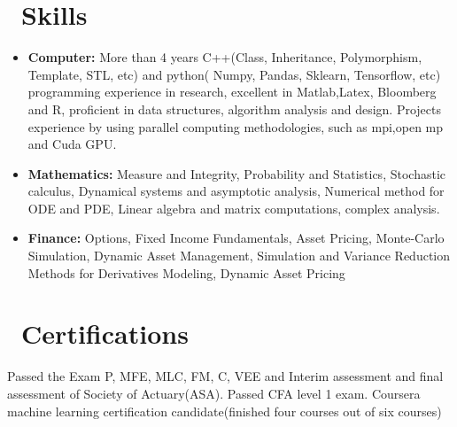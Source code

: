 \documentclass{resume}
\begin{document}
\section{\faWrench
\ Skills}
\begin{itemize}[parsep=0.5ex]\large
  \item \textbf{Computer:} More than 4 years C++(Class, Inheritance, Polymorphism, Template, STL, etc) and python( Numpy, Pandas,
  Sklearn, Tensorflow, etc) programming experience in research,  excellent in Matlab,Latex, Bloomberg and R, proficient in data structures, algorithm analysis and design. Projects experience by using parallel computing methodologies, such as mpi,open mp and Cuda GPU.
  
  \item \textbf{Mathematics:}
   Measure and Integrity, Probability and Statistics, Stochastic calculus, Dynamical systems and asymptotic analysis,
  Numerical method for ODE and PDE, Linear algebra and matrix computations, complex analysis.
  
  \item \textbf{Finance:} Options, Fixed Income Fundamentals, Asset Pricing, Monte-Carlo Simulation, Dynamic Asset Management,
  Simulation and Variance Reduction Methods for Derivatives Modeling, Dynamic Asset Pricing
  
\end{itemize}

\section{\faBook\ Certifications}\large 
Passed the Exam P, MFE, MLC, FM, C, VEE and Interim assessment and final assessment of Society of Actuary(ASA). Passed CFA level 1 exam. Coursera machine learning certification candidate(finished four courses out of six courses)

%
%
\end{document}
